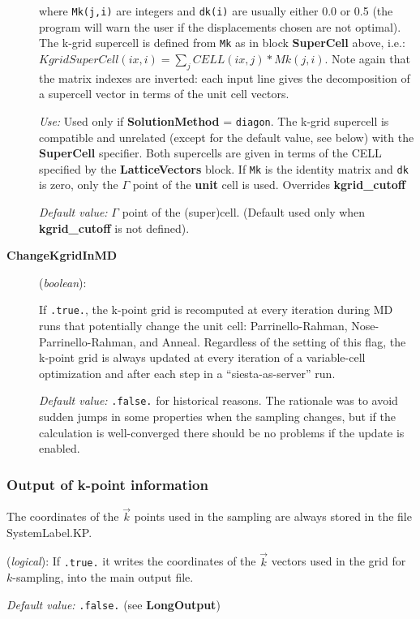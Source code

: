 \documentclass[11pt]{article}
\begin{document}
\begin{description}
where {\tt Mk(j,i)} are integers and {\tt dk(i)} are usually
either 0.0 or 0.5 (the program will warn the user if the displacements
chosen are not optimal).
The k-grid supercell is defined from {\tt Mk}
as in block {\bf SuperCell} above, i.e.:
$KgridSuperCell(ix,i) = \sum_j CELL(ix,j)*Mk(j,i)$.
Note again that the matrix indexes are inverted: each input line 
gives the decomposition of a supercell vector in terms of the unit
cell vectors.


{\it Use:} Used only if {\bf SolutionMethod} = {\tt diagon}.
The k-grid supercell is compatible and unrelated 
(except for the default value, see below)
with the {\bf SuperCell} specifier. Both supercells are given in 
terms of the CELL specified by the {\bf LatticeVectors} block.
If {\tt Mk} is the identity matrix and {\tt dk} 
is zero, only the $\Gamma$ point of the {\bf unit} cell is used. 
Overrides {\bf kgrid\_cutoff}

{\it Default value:} $\Gamma$ point of the (super)cell.
(Default used only when {\bf kgrid\_cutoff} is not defined).
        
\item[{\bf ChangeKgridInMD}] ({\it boolean}):

If {\tt .true.}, the k-point grid is
recomputed at every iteration during MD runs that potentially
change the unit cell: Parrinello-Rahman, Nose-Parrinello-Rahman, and
Anneal. Regardless of the setting of this flag, the k-point grid
is always updated at every iteration of a variable-cell optimization
and after each step in a ``siesta-as-server'' run.

{\it Default value:} {\tt .false.} for historical reasons. The
rationale was to avoid sudden jumps in some properties when the
sampling changes, but if the calculation is well-converged there
should be no problems if the update is enabled.

\end{description}

\subsubsection{Output of k-point information}

The coordinates of the $\vec k$ points used in the sampling
are always stored in the file SystemLabel.KP.

\begin{description}
\itemsep 10pt
\parsep 0pt
\item[{\bf WriteKpoints}] ({\it logical}):
If {\tt .true.} it writes the coordinates of the $\vec k$ vectors
used in the grid for $k$-sampling, into the main output file.

{\it Default value:} {\tt .false.} (see {\bf LongOutput})

\end{description}
\end{document}
